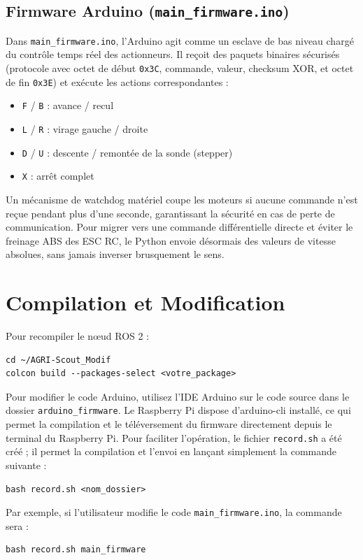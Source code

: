 \documentclass [12pt, a4paper]{article}
\begin{document}
\subsection{Firmware Arduino (\texttt{main\_firmware.ino})}
Dans \texttt{main\_firmware.ino}, l'Arduino agit comme un esclave de bas niveau chargé du contrôle temps réel des actionneurs. Il reçoit des paquets binaires sécurisés (protocole avec octet de début \texttt{0x3C}, commande, valeur, checksum XOR, et octet de fin \texttt{0x3E}) et exécute les actions correspondantes :
\begin{itemize}
    \item \texttt{F} / \texttt{B} : avance / recul
    \item \texttt{L} / \texttt{R} : virage gauche / droite
    \item \texttt{D} / \texttt{U} : descente / remontée de la sonde (stepper)
    \item \texttt{X} : arrêt complet
\end{itemize}
Un mécanisme de watchdog matériel coupe les moteurs si aucune commande n'est reçue pendant plus d'une seconde, garantissant la sécurité en cas de perte de communication. Pour migrer vers une commande différentielle directe et éviter le freinage ABS des ESC RC, le Python envoie désormais des valeurs de vitesse absolues, sans jamais inverser brusquement le sens.

\section{Compilation et Modification}
Pour recompiler le nœud ROS 2 :
\begin{verbatim}
cd ~/AGRI-Scout_Modif
colcon build --packages-select <votre_package>
\end{verbatim}

Pour modifier le code Arduino, utilisez l'IDE Arduino sur le code source dans le dossier \texttt{arduino\_firmware}. Le Raspberry Pi dispose d'arduino-cli installé, ce qui permet la compilation et le téléversement du firmware directement depuis le terminal du Raspberry Pi. Pour faciliter l'opération, le fichier \texttt{record.sh} a été créé ; il permet la compilation et l'envoi en lançant simplement la commande suivante :
\begin{verbatim}
bash record.sh <nom_dossier>
\end{verbatim}

Par exemple, si l'utilisateur modifie le code \texttt{main\_firmware.ino}, la commande sera :
\begin{verbatim}
bash record.sh main_firmware
\end{verbatim}
\end{document}
